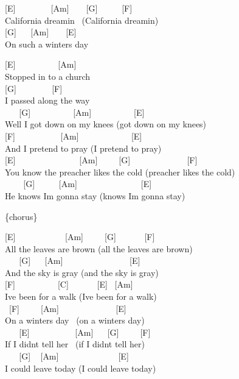 \documentclass[
  letterpaper,
]{scrbook}
\begin{document}
{[}E{]} ~ ~ ~ ~ ~{[}Am{]} ~ ~ {[}G{]} ~ ~ ~ {[}F{]}\\
California dreamin ~(California dreamin\textquotesingle)\\
\hspace*{0.333em} {[}G{]} ~ ~{[}Am{]} ~ ~ {[}E{]}\\
On such a winter\textquotesingle s day

{[}E{]} ~ ~ ~ ~ ~ ~{[}Am{]}\\
Stopped in to a church\\
{[}G{]} ~ ~ ~ ~ ~{[}F{]}\\
I passed along the way\\
\hspace*{0.333em} ~ ~ {[}G{]} ~ ~ ~ ~ ~ ~{[}Am{]} ~ ~ ~ ~ ~ ~{[}E{]}\\
Well I got down on my knees (got down on my knees)\\
{[}F{]} ~ ~ ~ ~ ~ ~ {[}Am{]} ~ ~ ~ ~ ~ ~ ~ {[}E{]}\\
And I pretend to pray (I pretend to pray)\\
{[}E{]} ~ ~ ~ ~ ~ ~ ~ ~ ~{[}Am{]} ~ ~ ~{[}G{]} ~ ~ ~ ~ ~ ~ ~ ~{[}F{]}\\
You know the preacher likes the cold (preacher likes the cold)\\
\hspace*{0.333em} ~ ~ ~{[}G{]} ~ ~ ~ {[}Am{]} ~ ~ ~ ~ ~ ~ ~ ~ ~{[}E{]}\\
He knows I\textquotesingle m gonna stay (knows I\textquotesingle m gonna
stay)

\{chorus\}

{[}E{]} ~ ~ ~ ~ ~ ~ ~{[}Am{]} ~ ~ ~{[}G{]} ~ ~ ~ ~{[}F{]}\\
All the leaves are brown (all the leaves are brown)\\
\hspace*{0.333em} ~ ~ {[}G{]} ~ ~{[}Am{]} ~ ~ ~ ~ ~ ~ ~ ~ ~ {[}E{]}\\
And the sky is gray (and the sky is gray)\\
{[}F{]} ~ ~ ~ ~ ~ ~{[}C{]} ~ ~ ~ ~{[}E{]} ~{[}Am{]}\\
I\textquotesingle ve been for a walk (I\textquotesingle ve been for a
walk)\\
\hspace*{0.333em} ~{[}F{]} ~ ~ ~{[}Am{]} ~ ~ ~ ~ ~ ~ ~ ~{[}E{]}\\
On a winter\textquotesingle s day ~(on a winter\textquotesingle s day)\\
\hspace*{0.333em} ~ ~ {[}E{]} ~ ~ ~ ~ ~ ~ {[}Am{]} ~ ~{[}G{]} ~ ~
~{[}F{]}\\
If I didn\textquotesingle t tell her ~(if I didn\textquotesingle t tell
her)\\
\hspace*{0.333em} ~ ~ {[}G{]} ~ {[}Am{]} ~ ~ ~ ~ ~ ~ ~ ~ {[}E{]}\\
I could leave today (I could leave today)
\end{document}
